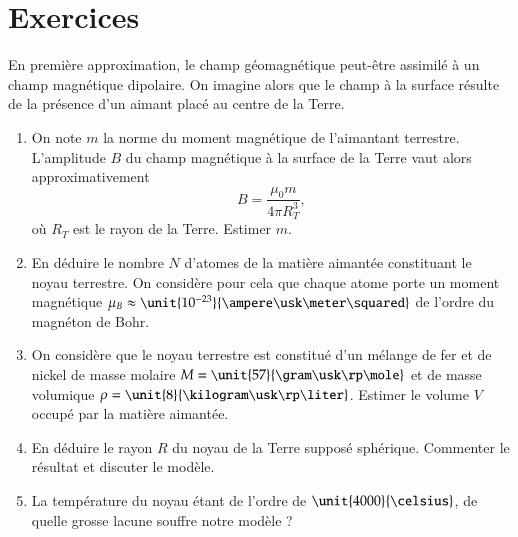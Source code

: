 \section{Exercices}

\begin{exocor} 
	En première approximation, le champ géomagnétique peut-être assimilé
	à un champ magnétique dipolaire. On imagine alors que le champ à la surface
	résulte de la présence d'un aimant placé au centre de la Terre.
	\begin{enumerate}
		\item On note $m$ la norme du moment magnétique de l'aimantant terrestre. 
		L'amplitude $B$ du champ magnétique à la surface de la Terre 
		vaut alors approximativement
		\begin{equation*}
			B = \dfrac{\mu_0 m}{4 \pi R_T^3},
		\end{equation*}
		où $R_T$ est le rayon de la Terre. Estimer $m$.
	\item En déduire le nombre $N$ d'atomes de la matière aimantée constituant le noyau
	  terrestre. On considère pour cela que chaque atome porte un moment
	  magnétique $\mu_B \approx \unit{10^{-23}}{\ampere \usk \meter \squared}$ 
	  de l'ordre du magnéton de Bohr.
	\item On considère que le noyau terrestre est constitué d'un mélange de fer
	  et de nickel de masse molaire $M = \unit{57}{\gram \usk \rp \mole}$
	  et de masse volumique $\rho = \unit{8}{\kilogram \usk \rp \liter}$.
	  Estimer le volume $V$ occupé par la matière aimantée.
	\item En déduire le rayon $R$ du noyau de la Terre supposé sphérique.
	  Commenter le résultat et discuter le modèle. 
	\item La température du noyau étant de l'ordre de $\unit{4000}{\celsius}$,
	  de quelle grosse lacune souffre notre modèle ?
	  
	\end{enumerate}
\end{exocor}

